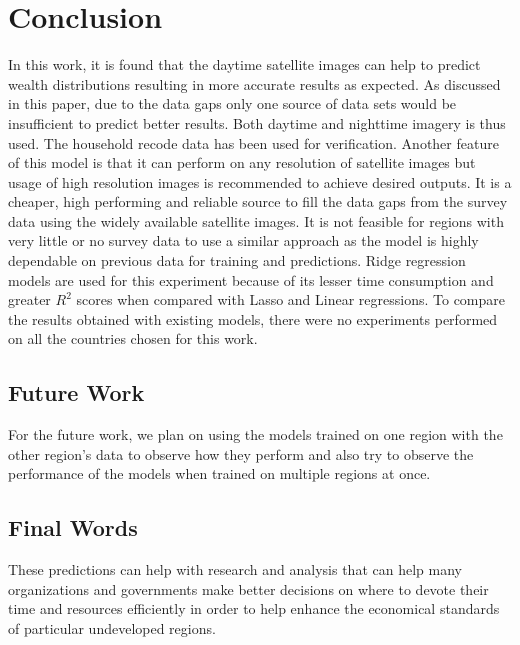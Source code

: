 \chapter{Conclusion}
In this work, it is found that the daytime satellite images can help to predict wealth distributions resulting in more accurate results as expected. As discussed in this paper, due to the data gaps only one source of data sets would be insufficient to predict better results. Both daytime and nighttime imagery is thus used. The household recode data has been used for verification. Another feature of this model is that it can perform on any resolution of satellite images but usage of high resolution images is recommended to achieve desired outputs. It is a cheaper, high performing and reliable source to fill the data gaps from the survey data using the widely available satellite images. It is not feasible for regions with very little or no survey data to use a similar approach as the model is highly dependable on previous data for training and predictions. Ridge regression models are used for this experiment because of its lesser time consumption and greater $R^2$ scores when compared with Lasso and Linear regressions. To compare the results obtained with existing models, there were no experiments performed on all the countries chosen for this work.  



\section{Future Work}
For the future work, we plan on using the models trained on one region with the other region's data to observe how they perform and also try to observe the performance of the models when trained on multiple regions at once.

\section{Final Words}
These predictions can help with research and analysis that can help many organizations and governments make better decisions on where to devote their time and resources efficiently in order to help enhance the economical standards of particular undeveloped regions.


